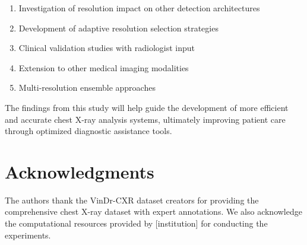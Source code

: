 \documentclass[10pt,twocolumn]{article}
\begin{document}
\begin{enumerate}
\item Investigation of resolution impact on other detection architectures
\item Development of adaptive resolution selection strategies
\item Clinical validation studies with radiologist input
\item Extension to other medical imaging modalities
\item Multi-resolution ensemble approaches
\end{enumerate}

The findings from this study will help guide the development of more efficient and accurate chest X-ray analysis systems, ultimately improving patient care through optimized diagnostic assistance tools.

\section*{Acknowledgments}

The authors thank the VinDr-CXR dataset creators for providing the comprehensive chest X-ray dataset with expert annotations. We also acknowledge the computational resources provided by [institution] for conducting the experiments.



\end{document}
